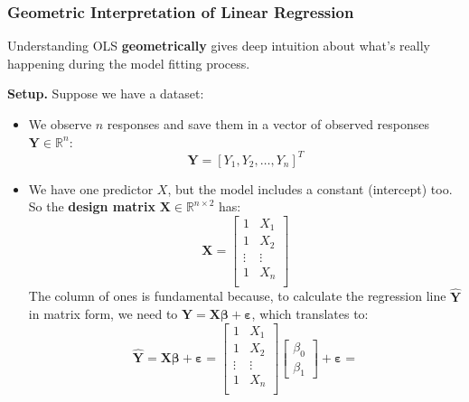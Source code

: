 \subsubsection{Geometric Interpretation of Linear Regression}

Understanding OLS \textbf{geometrically} gives deep intuition about what's really happening during the model fitting process.

\highspace
\textcolor{Red2}{ \textbf{Setup.}} Suppose we have a dataset:
\begin{itemize}
    \item We observe $n$ responses and save them in a vector of observed responses $\mathbf{Y} \in \mathbb{R}^{n}$:
    \begin{equation*}
        \mathbf{Y} = \left[Y_1, Y_2, \dots, Y_n\right]^{T}
    \end{equation*}
    \item We have one predictor $X$, but the model includes a constant (intercept) too. So the \textbf{design matrix} $\mathbf{X} \in \mathbb{R}^{n \times 2}$ has:
    \begin{equation*}
        \mathbf{X} = \begin{bmatrix}
            1       & X_{1}     \\
            1       & X_{2}     \\
            \vdots  & \vdots    \\
            1       & X_{n}     \\
        \end{bmatrix}
    \end{equation*}
    The column of ones is fundamental because, to calculate the regression line $\hat{\mathbf{Y}}$ in matrix form, we need to $\mathbf{Y} = \mathbf{X}\boldsymbol{\beta} + \boldsymbol{\varepsilon}$, which translates to:
    \begin{equation*}
        \hat{\mathbf{Y}} =
        \mathbf{X}\boldsymbol{\beta} + \boldsymbol{\varepsilon} =
        \begin{bmatrix}
            1 & X_{1} \\
            1 & X_{2} \\
            \vdots & \vdots \\
            1 & X_{n} \\
        \end{bmatrix}
        \begin{bmatrix}
            \beta_0 \\ \beta_1
        \end{bmatrix} + \boldsymbol{\varepsilon} =

\end{equation*}
\end{itemize}
